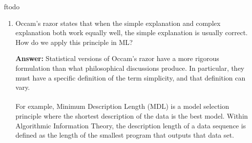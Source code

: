 ƒtodo\documentclass{article}
\newenvironment{QandA}{\begin{enumerate}[label=\arabic*.]}{\end{enumerate}}
\newenvironment{InnerQandA}{\begin{enumerate}[label=\roman*.]}{\end{enumerate}}
\newenvironment{answer}{\par\normalfont \textbf{Answer:}}{}
\begin{document}
\begin{QandA}
\begin{InnerQandA}
        \item Why is it empirical?
        \begin{answer}
            In practice, the risk $R(h)$ cannot be computed because the distribution $P(x, y)$ is unavailable. However, we can compute an approximation, called empirical risk, by averaging the loss function on the training set:
            \begin{align*}
                R_{\text{emp}} = \frac{1}{n}\sum_{i=1}^n L(h(x_i), y_i) 
            \end{align*}
            The empirical risk minimization principle states that the learning algorithm should choose a hypothesis $\hat{h}$ which minimizes the empirical risk:
            \begin{align*}
                \hat{h} = \argmin_{h \in \mathcal{H}} R_{\text{emp}}(h)
            \end{align*}
        \end{answer}

        \item How do we minimize that risk?
        \begin{answer}
            Empirical risk minimization for a classification problem with a 0-1 loss function is known to be an NP-hard problem even for linear classifiers. \\\\
            In practice, machine learning algorithms cope with this problem by employing a convex approximation to the 0-1 (like hinge loss for SVM), which is easier to optimize.
        \end{answer}
        
        (Source: \href{https://en.wikipedia.org/wiki/Empirical_risk_minimization}{Wikipedia})
    \end{InnerQandA}

    \item Occam's razor states that when the simple explanation and complex explanation both work equally well, the simple explanation is usually correct. How do we apply this principle in ML?
    \begin{answer}
        Statistical versions of Occam's razor have a more rigorous formulation than what philosophical discussions produce. In particular, they must have a specific definition of the term simplicity, and that definition can vary. \\\\
        For example, Minimum Description Length (MDL) is a model selection principle where the shortest description of the data is the best model. Within Algorithmic Information Theory, the description length of a data sequence is defined as the length of the smallest program that outputs that data set. 
    

\end{answer}
\end{QandA}
\end{document}
